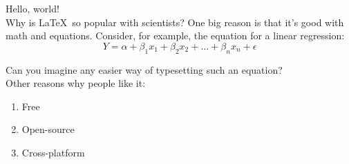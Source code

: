 \documentclass{article}
\begin{document}
Hello, world! \\

Why is \LaTeX\ so popular with scientists? One big reason is that it's good with math and equations. Consider, for example, the equation for a linear regression: $$Y = \alpha + \beta_1x_1 + \beta_2x_2 + \ldots + \beta_nx_n + \epsilon$$

Can you imagine any easier way of typesetting such an equation? \\

\noindent
Other reasons why people like it:
\begin{enumerate}
	\item{Free}
	\item{Open-source}
	\item{Cross-platform}
\end{enumerate}
	
\end{document}
